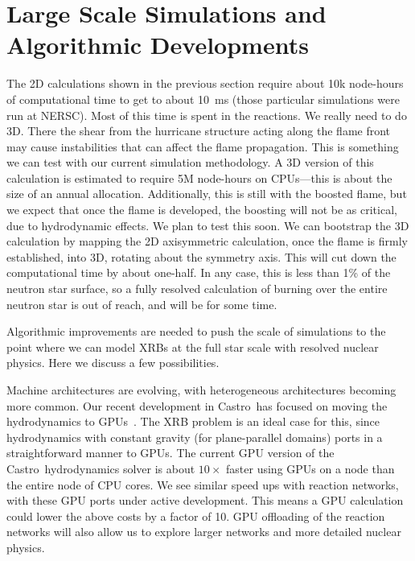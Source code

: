 \documentclass[a4paper]{jpconf}
\newcommand{\castro}{{\sffamily Castro}}
\newcommand{\MarginPar}[1]{\marginpar{\vskip-\baselineskip\raggedright\tiny\sffamily\hrule\smallskip{\color{red}#1}\par\smallskip\hrule}}
\begin{document}
\section{Large Scale Simulations and Algorithmic Developments}

The 2D calculations shown in the previous section require about 10k
node-hours of computational time to get to about 10~ms (those
particular simulations were run at NERSC).  Most of this time is spent
in the reactions\MarginPar{verify fraction}.  We really need to do 3D.
There the shear from the hurricane structure acting along the flame
front may cause instabilities that can affect the flame propagation.
This is something we can test with our current simulation methodology.
A 3D version of this calculation is estimated to require 5M node-hours
on CPUs---this is about the size of an annual \MarginPar{double check
  \#s} allocation.  Additionally, this is still with the boosted
flame, but we expect that once the flame is developed, the boosting
will not be as critical, due to hydrodynamic effects.  We plan to test
this soon.  We can bootstrap the 3D calculation by mapping the 2D
axisymmetric calculation, once the flame is firmly established, into
3D, rotating about the symmetry axis.  This will cut down the
computational time by about one-half.  In any case, this is less than
1\% of the neutron star surface, so a fully resolved calculation of
burning over the entire neutron star is out of reach, and will be for
some time.

Algorithmic improvements are needed to push the scale of simulations
to the point where we can model XRBs at the full star scale with
resolved nuclear physics.  Here we discuss a few possibilities.

Machine architectures are evolving, with heterogeneous architectures
becoming more common.  Our recent development in \castro\ has focused
on moving the hydrodynamics to GPUs~\cite{astronum:2017}.  The XRB
problem is an ideal case for this, since hydrodynamics with constant
gravity (for plane-parallel domains) ports in a straightforward manner
to GPUs.  The current GPU version of the \castro\ hydrodynamics solver
is about $10\times$ faster using GPUs on a node than the entire node
of CPU cores.  We see similar speed ups with reaction networks, with
these GPU ports under active development.  This means a GPU
calculation could lower the above costs by a factor of 10.  GPU
offloading of the reaction networks will also allow us to explore
larger networks and more detailed nuclear physics.
\end{document}
